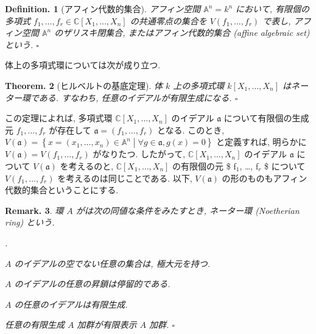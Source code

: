 \documentclass[openany, a4paper, oneside]{jsbook}
\newcounter{enum2}
\renewenvironment{enumerate}{%
\begin{list}%
{%
\arabic{enum2}.\ \,%
}%
{%
\usecounter{enum2}
\setlength{\itemindent}{0pt}%
\setlength{\leftmargin}{15pt}%
\setlength{\rightmargin}{0pt}%
\setlength{\labelsep}{0pt}%
\setlength{\labelwidth}{6pt}%
\setlength{\itemsep}{0pt}%
\setlength{\parsep}{0pt}%
\setlength{\listparindent}{0pt}%
}
}{%
\end{list}%
}
\theoremstyle{break}
\theoremstyle{breakdefn}
\newtheorem{thm}{Theorem.}[section]
\newtheorem{defn}[thm]{Definition.}
\newtheorem{rem}[thm]{Remark.}
\newcommand{\relmiddle}[1]{\mathrel{}\middle#1\mathrel{}}
\newcommand{\set}[2]{\left\{#1 \relmiddle| #2\right\}}
\newcommand{\fin}{\hfill $\square$ \par}
\begin{document}
\begin{defn}[アフィン代数的集合]
アフィン空間 $\mathbb{A}^n = k^n$ において,
有限個の多項式 $f_1, \dots, f_r \in \mathbb{C}[X_1, \dots, X_n]$ の共通零点の集合を
$V (f_1, \dots, f_r)$ で表し, アフィン空間 $\mathbb{A}^n$ のザリスキ閉集合,
またはアフィン代数的集合 (affine algebraic set) という. \fin
\end{defn}\label{waheyhey-algebraic-geometry-guidance2}
体上の多項式環については次が成り立つ.
\begin{thm}[ヒルベルトの基底定理]
体 $k$ 上の多項式環 $k[X_1, \dots, X_n]$ はネーター環である.
すなわち, 任意のイデアルが有限生成になる. \fin
\end{thm}
この定理によれば, 多項式環 $\mathbb{C}[X_1, \dots, X_n]$ のイデアル $\mathfrak{a}$
について有限個の生成元 ${f_1, \dots, f_r}$ が存在して $\mathfrak{a}=(f_1, \dots, f_r)$ となる.
このとき, $V (\mathfrak{a}) = \set{x = (x_1, \dots, x_n) \in \mathbb{A}^n}{\forall g \in \mathfrak{a}, g (x)=0}$
と定義すれば, 明らかに $V ( \mathfrak{a} ) = V (f_1, \dots, f_r)$ がなりたつ.
したがって, $\mathbb{C}[X_1, \dots, X_n]$ のイデアル $\mathfrak{a}$ について $V ( \mathfrak{a} )$ を考えるのと,
$\mathbb{C}[X_1, \dots, X_n]$ の有限個の元 \$ f$_1$, \dots{}, f$_r$ \$ について $V (f_1, \dots, f_r)$ を考えるのは同じことである.
以下, $V ( \mathfrak{a} )$ の形のものもアフィン代数的集合ということにする.
\begin{rem}
環 $A$ がは次の同値な条件をみたすとき, ネーター環 (Noetherian ring) という.
\begin{enumerate}
\item $A$ のイデアルの空でない任意の集合は, 極大元を持つ.
\item $A$ のイデアルの任意の昇鎖は停留的である.
\item $A$ の任意のイデアルは有限生成.
\item 任意の有限生成 $A$ 加群が有限表示 $A$ 加群. \fin
\end{enumerate}
\end{rem}
\end{document}
